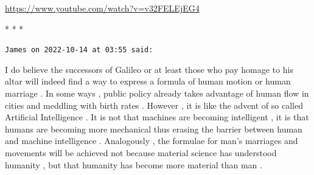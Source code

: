 \url{https://www.youtube.com/watch?v=v32FELEjEG4}


\begin{center}* * *\end{center}

\begin{footnotesize}
\begin{sffamily}
\texttt{James on 2022-10-14 at 03:55 said:}

I do believe the successors of Galileo or at least those who pay homage to his altar will indeed find a way to express a formula of human motion or human marriage . In some ways , public policy already takes advantage of human flow in cities and meddling with birth rates . However , it is like the advent of so called Artificial Intelligence . It is not that machines are becoming intelligent , it is that humans are becoming more mechanical thus erasing the barrier between human and machine intelligence . Analogously , the formulae for man's marriages and movements will be achieved not because material science has understood humanity , but that humanity has become more material than man .


\hfill

\end{sffamily}
\end{footnotesize}


